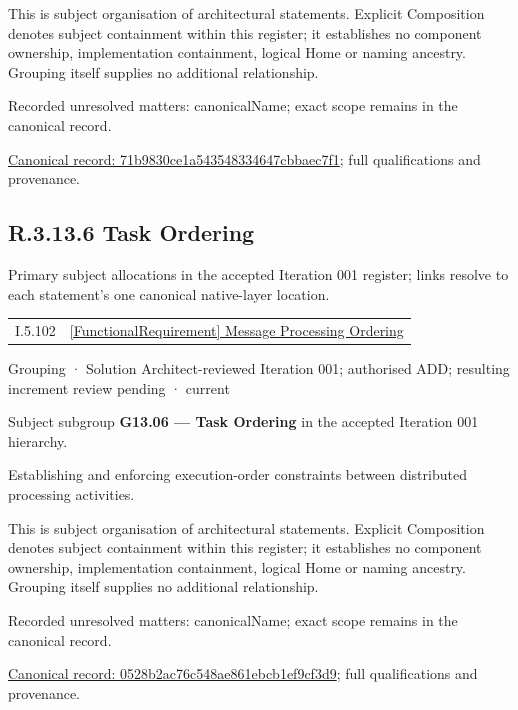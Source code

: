 This is subject organisation of architectural statements. Explicit Composition denotes subject containment within this register; it establishes no component ownership, implementation containment, logical Home or naming ancestry. Grouping itself supplies no additional relationship.


{\small Recorded unresolved matters: canonicalName; exact scope remains in the canonical record.}\par
{\footnotesize \href{../../../../continuum/grouping/71b9830ce1a543548334647cbbaec7f1.md}{Canonical record: 71b9830ce1a543548334647cbbaec7f1}; full qualifications and provenance.}\par
\subsection*{R.3.13.6 Task Ordering}
\label{navigation:R.3.13.6}

Primary subject allocations in the accepted Iteration 001 register; links resolve to each statement’s one canonical native-layer location.\par
\begin{longtable}{p{.22\linewidth}p{.73\linewidth}}
I.5.102 & \hyperref[element:3c11adccd7194276b787416368c13858]{[FunctionalRequirement] Message Processing Ordering} \\
\end{longtable}
\label{element:0528b2ac76c548ae861ebcb1ef9cf3d9}
{\small Grouping · Solution Architect-reviewed Iteration 001; authorised ADD; resulting increment review pending · current}\par

Subject subgroup \textbf{G13.06 — Task Ordering} in the accepted Iteration 001 hierarchy.



Establishing and enforcing execution-order constraints between distributed processing activities.



This is subject organisation of architectural statements. Explicit Composition denotes subject containment within this register; it establishes no component ownership, implementation containment, logical Home or naming ancestry. Grouping itself supplies no additional relationship.


{\small Recorded unresolved matters: canonicalName; exact scope remains in the canonical record.}\par
{\footnotesize \href{../../../../continuum/grouping/0528b2ac76c548ae861ebcb1ef9cf3d9.md}{Canonical record: 0528b2ac76c548ae861ebcb1ef9cf3d9}; full qualifications and provenance.}\par
